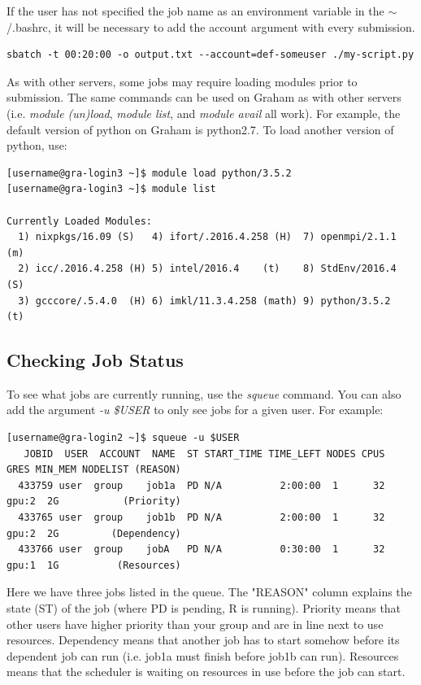 \documentclass[12pt]{article}
\begin{document}
\quad If the user has not specified the job name as an environment variable in the $\sim$/.bashrc, it will be necessary to add the account argument with every submission.

\begin{lstlisting}[numbers=none, basicstyle=\normalsize]
sbatch -t 00:20:00 -o output.txt --account=def-someuser ./my-script.py
\end{lstlisting}

\quad As with other servers, some jobs may require loading modules prior to submission. The same commands can be used on Graham as with other servers (i.e. \textit{module (un)load}, \textit{module list}, and \textit{module avail} all work). For example, the default version of python on Graham is python2.7. To load another version of python, use:

\begin{lstlisting}[numbers=none]
[username@gra-login3 ~]$ module load python/3.5.2
[username@gra-login3 ~]$ module list

Currently Loaded Modules:
  1) nixpkgs/16.09 (S)   4) ifort/.2016.4.258 (H)  7) openmpi/2.1.1 (m)
  2) icc/.2016.4.258 (H) 5) intel/2016.4    (t)    8) StdEnv/2016.4 (S)
  3) gcccore/.5.4.0  (H) 6) imkl/11.3.4.258 (math) 9) python/3.5.2  (t)

\end{lstlisting}

\subsection{Checking Job Status}

\quad To see what jobs are currently running, use the \textit{squeue} command. You can also add the argument \textit{-u \$USER} to only see jobs for a given user. For example:

\begin{lstlisting}[numbers=none, basicstyle=\tiny]
[username@gra-login2 ~]$ squeue -u $USER
   JOBID  USER  ACCOUNT  NAME  ST START_TIME TIME_LEFT NODES CPUS   GRES MIN_MEM NODELIST (REASON) 
  433759 user  group    job1a  PD N/A          2:00:00  1      32  gpu:2  2G           (Priority) 
  433765 user  group    job1b  PD N/A          2:00:00  1      32  gpu:2  2G         (Dependency) 
  433766 user  group    jobA   PD N/A          0:30:00  1      32  gpu:1  1G          (Resources) 
\end{lstlisting} 

\quad Here we have three jobs listed in the queue. The "REASON" column explains the state (ST) of the job (where PD is pending, R is running). Priority means that other users have higher priority than your group and are in line next to use resources. Dependency means that another job has to start somehow before its dependent job can run (i.e. job1a must finish before job1b can run). Resources means that the scheduler is waiting on resources in use before the job can start. 
\end{document}
